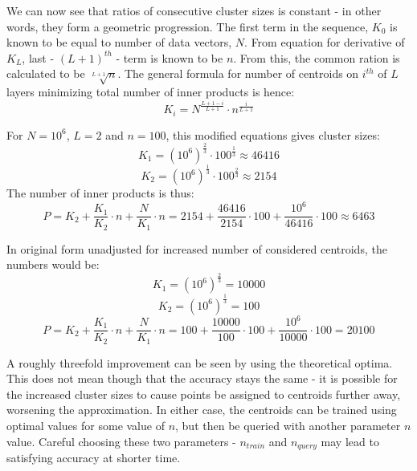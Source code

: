 We can now see that ratios of consecutive cluster sizes is constant - in other
words, they form a geometric progression. The first term in the sequence,
$K_0$ is known to be equal to number of data vectors, $N$. From equation
for derivative of $K_L$, last - $(L+1)^{th}$ - term is known to be $n$. From this,
the common ration is calculated to be $\sqrt[L+1]{n}$. The general formula
for number of centroids on $i^{th}$ of $L$ layers minimizing total number of
inner products is hence:
$$
K_i = N^{\frac{L+1-i}{L+1}} \cdot n^\frac{i}{L+1}
$$

For $N = 10^6$, $L = 2$ and $n = 100$, this modified equations gives cluster sizes:
$$ K_1 = (10^6)^{\frac{2}{3}} \cdot 100^\frac{1}{3} \approx 46416 $$
$$ K_2 = (10^6)^{\frac{1}{3}} \cdot 100^\frac{2}{3} \approx 2154 $$
The number of inner products is thus:
$$ 
P = K_2 + \frac{K_1}{K_2} \cdot n + \frac{N}{K_1} \cdot n =
2154 + \frac{46416}{2154} \cdot 100 + \frac{10^6}{46416} \cdot 100 \approx
6463
$$

In original form unadjusted for increased number of considered centroids,
the numbers would be:
$$ K_1 = (10^6)^{\frac{2}{3}} = 10000 $$
$$ K_2 = (10^6)^{\frac{1}{3}} = 100 $$
$$ 
P = K_2 + \frac{K_1}{K_2} \cdot n + \frac{N}{K_1} \cdot n =
100 + \frac{10000}{100} \cdot 100 + \frac{10^6}{10000} \cdot 100 =
20100
$$

A roughly threefold improvement can be seen by using the theoretical optima.
This does not mean though that the accuracy stays the same - it is possible
for the increased cluster sizes to cause points be assigned to centroids
further away, worsening the approximation. In either case, the centroids can
be trained using optimal values for some value of $n$, but then be queried
with another parameter $n$ value. Careful choosing these two parameters -
$n_{train}$ and $n_{query}$ may lead to satisfying accuracy at shorter time.
